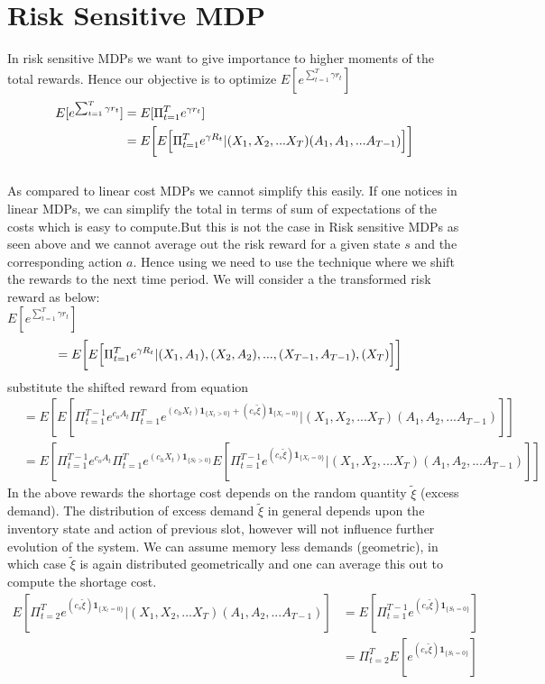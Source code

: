 \documentclass[11pt,a4paper,oneside]{report}
\begin{document}
\section{Risk Sensitive MDP}
In risk sensitive MDPs we want to give importance to higher moments of the total rewards. Hence our objective is to optimize $E[e^{\sum_{t=1}^T \gamma r_t}]$
\begin{align}
E[e^{\sum_{t=1}^T \gamma r_t}]&=E[\Pi_{t=1}^Te^{ \gamma r_t}]\\
\nonumber
&=E \bigg{[}E\Big[\Pi_{t=1}^{T}e^{\gamma R_t}|(X_1,X_2,...X_T)(A_1,A_1,...A_{T-1})\Big]\bigg] 
\end{align}
\\ As compared to linear cost MDPs we cannot simplify this easily. If one notices in linear MDPs, we can simplify the total in terms of sum of expectations of the costs which is easy to compute.But this is not the case in Risk sensitive MDPs as seen above and we cannot average out the risk reward for a given state $s$ and the corresponding action $a$.  Hence using we need to use the technique where we shift the rewards to the next time period. We will consider a the transformed risk reward as below:\\
$E[e^{\sum_{t=1}^T \gamma r_t}]$
\begin{align}
&=E \bigg{[}E\Big[\Pi_{t=1}^{T}e^{\gamma R_t}|{(X_1,A_1),(X_2,A_2),...,(X_{T-1},A_{T-1}),(X_T)}\Big]\bigg]
\end{align}
substitute the shifted reward from equation
\begin{align}
&=E[E[\Pi_{t=1}^{T-1} e^{c_o A_t}\Pi_{t=1}^{T}e^{(c_h X_t)\mathbf{1}_{\lbrace X_t>0\rbrace}+(c_s \tilde{\xi})\mathbf{1}_{\lbrace X_t=0\rbrace}}|(X_1,X_2,...X_T)(A_1,A_2,...A_{T-1})]]\\
\nonumber
&=E[\Pi_{t=1}^{T-1} e^{c_o A_t}\Pi_{t=1}^{T}e^{(c_h X_t)\mathbf{1}_{\lbrace S_t>0\rbrace}}E[\Pi_{t=1}^{T-1}e^{(c_s \tilde{\xi})\mathbf{1}_{\lbrace X_t=0\rbrace}}|(X_1,X_2,...X_T)(A_1,A_2,...A_{T-1})]]
\end{align}
In the above rewards the shortage cost depends on the random quantity $\tilde\xi$ (excess demand). The distribution of excess demand $\tilde\xi$ in general depends upon the inventory state and action of previous slot, however will not influence further evolution of the system.  We can assume memory less demands (geometric), in which case $\tilde\xi$ is again distributed geometrically and one can average this out to compute the shortage cost.
\begin{align}
E[\Pi_{t=2}^{T}e^{(c_s \tilde{\xi})\mathbf{1}_{\lbrace X_t=0\rbrace}}|(X_1,X_2,...X_T)(A_1,A_2,...A_{T-1})]&=E[\Pi_{t=1}^{T-1}e^{(c_s \tilde{\xi})\mathbf{1}_{\lbrace S_t=0\rbrace}}]\\ \nonumber
&=\Pi_{t=2}^{T}E[e^{(c_s \tilde{\xi})\mathbf{1}_{\lbrace S_t=0\rbrace}}]
\end{align}
\end{document}
